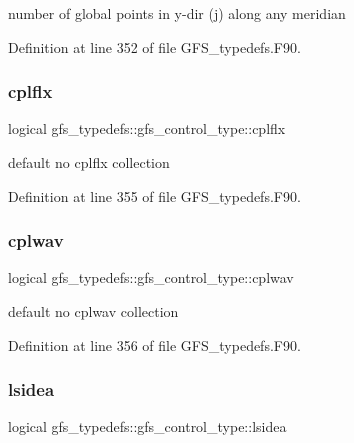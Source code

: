 number of global points in y-\/dir (j) along any meridian 



Definition at line 352 of file G\+F\+S\+\_\+typedefs.\+F90.

\mbox{\label{structgfs__typedefs_1_1gfs__control__type_a6b8eeda35f88a80d96b072f1a541e686}} 
\subsubsection{cplflx}
{\footnotesize\ttfamily logical gfs\+\_\+typedefs\+::gfs\+\_\+control\+\_\+type\+::cplflx}



default no cplflx collection 



Definition at line 355 of file G\+F\+S\+\_\+typedefs.\+F90.

\mbox{\label{structgfs__typedefs_1_1gfs__control__type_af430b97d065a7c62a0f6b539d0c614bb}} 
\subsubsection{cplwav}
{\footnotesize\ttfamily logical gfs\+\_\+typedefs\+::gfs\+\_\+control\+\_\+type\+::cplwav}



default no cplwav collection 



Definition at line 356 of file G\+F\+S\+\_\+typedefs.\+F90.

\mbox{\label{structgfs__typedefs_1_1gfs__control__type_a0a0c79eef72a93dd90ced81a9b190ac8}} 
\subsubsection{lsidea}
{\footnotesize\ttfamily logical gfs\+\_\+typedefs\+::gfs\+\_\+control\+\_\+type\+::lsidea}



